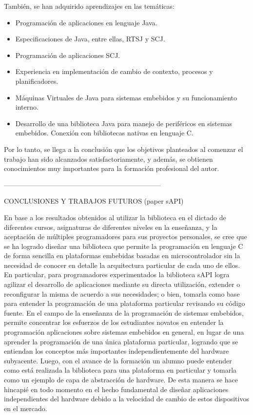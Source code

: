 \medskip

\noindent También, se han adquirido aprendizajes en las temáticas:

\begin{itemize}
\item
Programación de aplicaciones en lenguaje Java.
\item
Especificaciones de Java, entre ellas, RTSJ y SCJ.
\item
Programación de aplicaciones SCJ.
\item
Experiencia en implementación de cambio de contexto, procesos y planificadores.
\item
Máquinas Virtuales de Java para sistemas embebidos y su funcionamiento interno.
\item
Desarrollo de una biblioteca Java para manejo de periféricos en sistemas embebidos. Conexión con bibliotecas nativas en lenguaje C.
\end{itemize}

\medskip

Por lo tanto, se llega a la conclusión que los objetivos planteados al comenzar el trabajo han sido alcanzados satisfactoriamente, y además, se obtienen conocimientos muy importantes para la formación profesional del autor.

---------------------------------------------------------------------

CONCLUSIONES Y TRABAJOS  FUTUROS (paper sAPI)

En base a los resultados obtenidos al utilizar la biblioteca en el dictado de diferentes cursos, asignaturas de diferentes niveles en la enseñanza, y la aceptación de múltiples programadores para sus proyectos personales, se cree que se ha logrado diseñar una biblioteca que permite la programación en lenguaje C de forma sencilla en plataformas embebidas basadas en microcontrolador sin la necesidad de conocer en detalle la arquitectura particular de cada uno de ellos. En particular, para programadores experimentados la biblioteca sAPI logra agilizar el desarrollo de aplicaciones mediante su directa utilización, extender o reconfigurar la misma de acuerdo a sus necesidades; o bien, tomarla como base para entender la programación de una plataforma particular revisando su código fuente. En el campo de la enseñanza de la programación de sistemas embebidos, permite concentrar los esfuerzos de los estudiantes novatos en entender la programación aplicaciones sobre sistemas embebidos en general, en lugar de una aprender la programación de una única plataforma particular, logrando que se entiendan los conceptos más importantes independientemente del hardware subyacente. Luego, con el avance de la formación un alumno puede entender como está realizada la biblioteca para una plataforma en particular y tomarla como un ejemplo de capa de abstracción de hardware. De esta manera se hace hincapié en todo momento en el hecho fundamental de diseñar aplicaciones independientes del hardware debido a la velocidad de cambio de estos dispositivos en el mercado.

